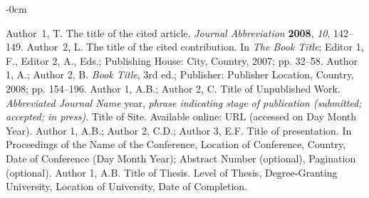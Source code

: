 \documentclass[journal,article,submit,pdftex,moreauthors]{Definitions/mdpi}
\begin{document}
\begin{adjustwidth}{-\extralength}{0cm}
\begin{thebibliography}{999}
Author~1, T. The title of the cited article. {\em Journal Abbreviation} {\bf 2008}, {\em 10}, 142--149.
Author~2, L. The title of the cited contribution. In {\em The Book Title}; Editor 1, F., Editor 2, A., Eds.; Publishing House: City, Country, 2007; pp. 32--58.
Author 1, A.; Author 2, B. \textit{Book Title}, 3rd ed.; Publisher: Publisher Location, Country, 2008; pp. 154--196.
Author 1, A.B.; Author 2, C. Title of Unpublished Work. \textit{Abbreviated Journal Name} year, \textit{phrase indicating stage of publication (submitted; accepted; in press)}.
Title of Site. Available online: URL (accessed on Day Month Year).
Author 1, A.B.; Author 2, C.D.; Author 3, E.F. Title of presentation. In Proceedings of the Name of the Conference, Location of Conference, Country, Date of Conference (Day Month Year); Abstract Number (optional), Pagination (optional).
Author 1, A.B. Title of Thesis. Level of Thesis, Degree-Granting University, Location of University, Date of Completion.
\end{thebibliography}

%


\PublishersNote{}
\end{adjustwidth}
\end{document}
